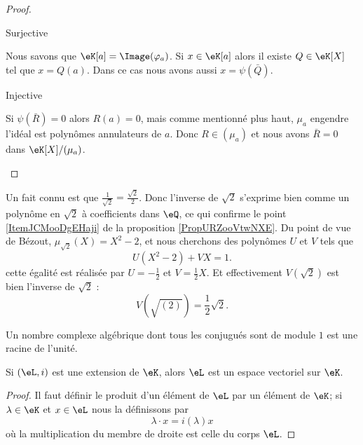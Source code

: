 \begin{proof}
\begin{enumerate}
\begin{subproof}
            \item[Surjective]

                Nous savons que \( \eK[a]=\Image(\varphi_a)\). Si \( x\in \eK[a]\) alors il existe \( Q\in \eK[X]\) tel que \( x=Q(a)\). Dans ce cas nous avons aussi \( x=\psi(\bar Q)\).

            \item[Injective]

                Si \( \psi(\bar R)=0\) alors \( R(a)=0\), mais comme mentionné plus haut, \( \mu_a\) engendre l'idéal est polynômes annulateurs de \( a\). Donc \( R\in (\mu_a)\) et nous avons \( \bar R=0\) dans \( \eK[X]/(\mu_a)\).

            \end{subproof}
                
    \end{enumerate}
\end{proof}

\begin{example}
    Un fait connu est que \( \frac{1}{ \sqrt{2} }=\frac{ \sqrt{2} }{ 2 }\). Donc l'inverse de \( \sqrt{2}\) s'exprime bien comme un polynôme en \( \sqrt{2}\) à coefficients dans \( \eQ\), ce qui confirme le point \ref{ItemJCMooDgEHaji} de la proposition \ref{PropURZooVtwNXE}. Du point de vue de Bézout, \( \mu_{\sqrt{2}}(X)=X^2-2\), et nous cherchons des polynômes \( U\) et \( V\) tels que
    \begin{equation}
        U(X^2-2)+VX=1.
    \end{equation}
    cette égalité est réalisée par \( U=-\frac{ 1 }{2}\) et \( V=\frac{ 1 }{2}X\). Et effectivement \( V(\sqrt{2})\) est bien l'inverse de \( \sqrt{2}\) :
    \begin{equation}
        V(\sqrt{(2)})=\frac{ 1 }{2}\sqrt{2}.
    \end{equation}
\end{example}

\begin{lemma}
    Un nombre complexe algébrique dont tous les conjugués sont de module \( 1\) est une racine de l'unité.
\end{lemma}

\begin{lemma}       \label{LemooOLIIooXzdppM}
    Si \( (\eL,i)\) est une extension de \( \eK\), alors \( \eL\) est un espace vectoriel sur \( \eK\).
\end{lemma}

\begin{proof}
    Il faut définir le produit d'un élément de \( \eL\) par un élément de \( \eK\); si \( \lambda\in \eK\) et \( x\in \eL\) nous la définissons par
    \begin{equation}
        \lambda\cdot x=i(\lambda)x
    \end{equation}
    où la multiplication du membre de droite est celle du corps \( \eL\). 
\end{proof}

